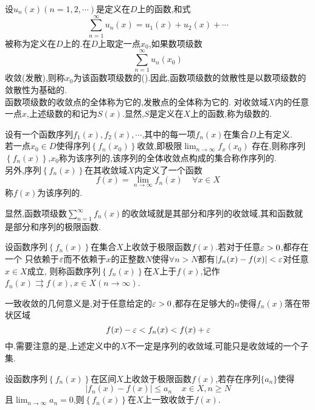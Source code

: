 \documentclass{ctexart}
\begin{document}
\pagestyle{empty}
\begin{center}\large{}\end{center}
\begin{definition}[函数项级数]
   设$u_n(x)(n=1,2,\cdots)$是定义在$D$上的函数,和式
   \[\sum_{n=1}^{\infty}u_n(x)=u_1(x)+u_2(x)+\cdots\]
   被称为定义在$D$上的.在$D$上取定一点$x_0$,如果数项级数
   \[\sum_{n=1}^{\infty}u_n\left(x_0\right)\]
   收敛(发散),则称$x_0$为该函数项级数的().因此,函数项级数的敛散性是以数项级数的敛散性为基础的.\\
   函数项级数的收敛点的全体称为它的,发散点的全体称为它的.%
   对收敛域$X$内的任意一点$x$,上述级数的和记为$S(x)$.显然,$S$是定义在$X$上的函数,称为级数的.
\end{definition}
\noindent{}
\begin{definition}[2.1 函数序列的收敛性和极限函数]
    设有一个函数序列$f_1(x),f_2(x),\cdots$,其中的每一项$f_n(x)$在集合$D$上有定义.\\
    若一点$x_0\in D$使得序列$\left\{f_n\left(x_0\right)\right\}$收敛,即极限$\displaystyle\lim_{n\to\infty}f_x\left(x_0\right)$%
    存在,则称序列$\left\{f_n(x)\right\}$,$x_0$称为该序列的,该序列的全体收敛点构成的集合称作序列的.\\
    另外,序列$\left\{f_n(x)\right\}$在其收敛域$X$内定义了一个函数
    \[f(x)=\lim_{n\to\infty}f_n(x)\ \ \ \ \ \forall x\in X\]
    称$f(x)$为该序列的.
\end{definition}\noindent
显然,函数项级数$\displaystyle\sum_{n=1}^{\infty}f_n(x)$的收敛域就是其部分和序列的收敛域,其和函数就是部分和序列的极限函数.
\begin{definition}[2.2 一致收敛]
    设函数序列$\left\{f_n(x)\right\}$在集合$X$上收敛于极限函数$f(x)$.若对于任意$\varepsilon>0$,都存在一个%
    只依赖于$\varepsilon$而不依赖于$x$的正整数$N$使得$\forall n>N$都有$\left|f_n(x)-f(x)\right|<\varepsilon$对任意$x\in X$成立,%
    则称函数序列$\left\{f_n(x)\right\}$在$X$上于$f(x)$,记作$f_n(x)\rightrightarrows f(x),x\in X(n\to\infty)$.
\end{definition}\noindent
一致收敛的几何意义是,对于任意给定的$\varepsilon>0$,都存在足够大的$n$使得$f_n(x)$落在带状区域
\[f(x)-\varepsilon<f_n(x)<f(x)+\varepsilon\]
中.需要注意的是,上述定义中的$X$不一定是序列的收敛域,可能只是收敛域的一个子集.
\begin{formal}[2.3 一致收敛的判据I]
    设函数序列$\left\{f_n(x)\right\}$在区间$X$上收敛于极限函数$f(x)$,若存在序列$\{a_n\}$使得
    \[\left|f_n(x)-f(x)\right|\leqslant a_n\ \ \ \ \ x\in X,n\geqslant N\]
    且$\displaystyle\lim_{n\to\infty}a_n=0$,则$\left\{f_n(x)\right\}$在$X$上一致收敛于$f(x)$.
\end{formal}
\end{document}
